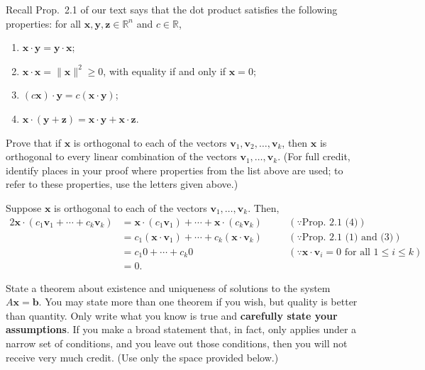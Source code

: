 \documentclass[answers,addpoints,12pt]{exam}
\theoremstyle{remark}
\renewcommand{\vec}[1]{\mathbf{#1}}
\newcommand{\<}{\ensuremath{\langle}}
\renewcommand{\>}{\ensuremath{\rangle}}
\newcommand{\R}{\ensuremath{\mathbb{R}}}
\newcommand\vb{\vec{b}}
\newcommand\vv{\vec{v}}
\newcommand\vx{\vec{x}}
\newcommand\vy{\vec{y}}
\newcommand\vz{\vec{z}}
\begin{document}
\begin{questions}
\begin{parts}
  \end{parts}

\newpage


\question[10]
Recall Prop.~2.1 of our text says that the dot product satisfies the following properties:
for all $\vx, \vy, \vz \in \R^n$ and $c \in \R$,
\begin{enumerate}
\item $\vx \cdot \vy = \vy \cdot \vx$;
\item $\vx \cdot \vx = \|\vx\|^2 \geq 0$, with equality if and only if $\vx = 0$;
\item $(c\vx) \cdot \vy = c(\vx \cdot \vy)$;
\item $\vx \cdot (\vy + \vz) = \vx \cdot \vy + \vx \cdot \vz$.
\end{enumerate}

Prove that if $\vx$ is orthogonal to each of the vectors 
$\vv_1, \vv_2, \dots, \vv_k$, then  $\vx$ is orthogonal to every linear
combination of the vectors $\vv_1,\dots, \vv_k$.  (For full credit,
identify places in your proof where properties from the list above are used;
to refer to these properties, use the letters given above.)

\begin{solution}
  Suppose $\vx$ is orthogonal to each of the vectors $\vv_1,\dots, \vv_k$. Then,
  \begin{alignat*}{2}
    \vx \cdot (c_1 \vv_1 + \cdots + c_k \vv_k) 
    &= \vx\cdot (c_1 \vv_1) + \cdots + \vx\cdot (c_k \vv_k)
    &\quad & (\because \text{Prop.~2.1 (4)})\\
    &= c_1 (\vx\cdot \vv_1) + \cdots + c_k (\vx\cdot \vv_k)
    &\quad & (\because \text{Prop.~2.1 (1) and (3)})\\
    &= c_1 0 + \cdots + c_k 0 
    &\quad & (\because \vx\cdot \vv_i = 0 \text{ for all $1\leq i\leq k$})\\
    &= 0.
  \end{alignat*}
\end{solution}




\question[5] 
\label{qu:3}
State a theorem about existence and uniqueness of solutions to the system $A
    \vx = \vb$. You may state more than one theorem if you wish, but
    quality is better than quantity. Only write what you know is true and 
    {\bf carefully state your assumptions}.  If you make a broad statement that, in fact, only applies
    under a narrow set of conditions, and you leave out those conditions, then you will not receive
    very much credit. (Use only the space provided below.)
    

\end{questions}
\end{document}
